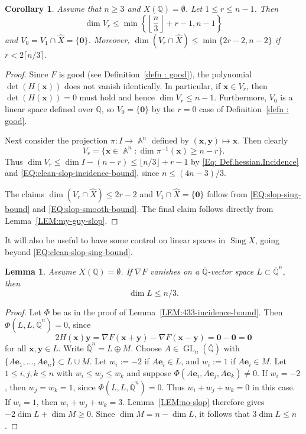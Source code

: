 \documentclass[a4paper,11pt, twoside,reqno]{amsart}
\theoremstyle{plain}
\newtheorem{cor}[thm]{Corollary}
\newtheorem{lemma}[thm]{Lemma}
\theoremstyle{definition}
\theoremstyle{remark}
\newcommand{\bfe}{\bm{e}}
\newcommand{\bfx}{\bm{x}}
\newcommand{\bfy}{\bm{y}}
\newcommand{\QQ}{\mathbb{Q}}
\DeclareMathOperator{\sing}{Sing}
\DeclareMathOperator{\GL}{GL}
\DeclareMathOperator{\A}{\mathbb{A}}
\renewcommand{\le}{\leqslant}
\renewcommand{\leq}{\leqslant}
\renewcommand{\ge}{\geqslant}
\renewcommand{\geq}{\geqslant}
\newcommand{\Qbar}{\overline{\mathbb{Q}}}
\newcommand{\cone}{\widehat}
\numberwithin{equation}{section}
\begin{document}
\begin{cor}
\label{cor:hesrank}
Assume that $n\ge 3$
and $X(\QQ)=\emptyset$.
Let $1\leq r \leq n-1$.
Then
$$\dim V_r\leq \min \left\{\left\lfloor \frac{n}{3}\right\rfloor +r-1, n-1\right\}$$
and $V_0 = V_1\cap \cone X = \{\bm0\}$.
Moreover, $\dim(V_r\cap \cone X)\leq \min\{2r-2,n-2\}$ if $r<2\lceil n/3\rceil$.
\end{cor}
\begin{proof}
Since $F$ is good (see Definition~\ref{defn : good}),
the polynomial $\det(H(\bm{x}))$ does not vanish identically.
In particular, if $\bm{x}\in V_r$, then $\det(H(\bm{x}))=0$ must hold and hence $\dim V_r\leq n-1$.
Furthermore, $V_0$ is a linear space defined over $\QQ$,
so $V_0 = \{\bm0\}$ by the $r=0$ case of Definition~\ref{defn : good}.

Next consider the projection $\pi\colon I\to \A^n$ defined by $(\bm{x},\bm{y})\mapsto \bm{x}$. Then clearly 
$$V_r=
\{\bm{x}\in \A^n\colon \dim \pi^{-1}(\bm{x})\geq n-r\}.
$$
Thus $\dim V_r \leq \dim I - (n-r)\leq \lfloor n/3 \rfloor +r-1$
by \eqref{Eq: Def.hessian.Incidence} and \eqref{EQ:clean-slop-incidence-bound},
since $n \le (4n-3)/3$.

The claims $\dim(V_r\cap \cone X) \le 2r-2$
and $V_1\cap \cone X = \{\bm0\}$
follow from \eqref{EQ:slop-sing-bound} and \eqref{EQ:slop-smooth-bound}.
The final claim follows directly from
Lemma~\ref{LEM:my-guy-slop}.
\end{proof}

It will also be useful to have some control on linear spaces in $\sing X$,
going beyond \eqref{EQ:clean-slop-sing-bound}.

\begin{lemma}
\label{LEM:no-slop-singular-linear}
Assume $X(\QQ)=\emptyset$.
If $\nabla F$ vanishes on
a $\Qbar$-vector space $L\subset\Qbar^n$,
then $$\dim L\le n/3.$$
\end{lemma}

\begin{proof}
Let $\Phi$ be as in the proof of Lemma~\ref{LEM:433-incidence-bound}.
Then $\Phi(L,L,\Qbar^n) = 0$,
since $$2H(\bfx)\bfy = \nabla F(\bfx+\bfy) - \nabla F(\bfx-\bfy) = \bm0-\bm0 = \bm0$$
for all $\bfx,\bfy\in L$.
Write $\Qbar^n=L\oplus M$.
Choose $A\in \GL_n(\Qbar)$ with
$\{A\bfe_1,\dots,A\bfe_n\}
\subset L \cup M$.
Let $w_i := -2$ if $A\bfe_i\in L$, and $w_i := 1$ if $A\bfe_i\in M$.
Let $1\le i,j,k\le n$ with $w_i\le w_j\le w_k$
and suppose $\Phi(A\bfe_i,A\bfe_j,A\bfe_k) \ne 0$.
If $w_i = -2$, then $w_j=w_k=1$, since $\Phi(L,L,\Qbar^n) = 0$.
Thus $w_i+w_j+w_k=0$ in this case.
If $w_i=1$, then $w_i+w_j+w_k=3$.
Lemma~\ref{LEM:no-slop} therefore gives
$-2\dim L + \dim M \ge 0$.
Since $\dim M = n - \dim L$, it follows that $3\dim L \le n$.
\end{proof}
\end{document}
